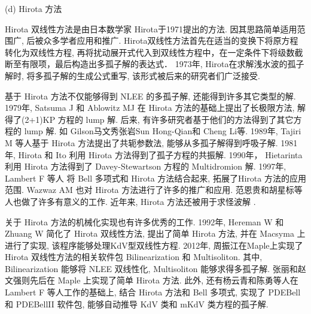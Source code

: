 (d) Hirota 方法

Hirota 双线性方法是由日本数学家 Hirota\cite{hirota1971exact}于1971提出的方法. 因其思路简单\D 适用范围广, 后被众多学者应用和推广. Hirota双线性方法首先在适当的变换下将原方程转化为双线性方程, 再将扰动展开式代入到双线性方程中，在一定条件下将级数截断至有限项，最后构造出多孤子解的表达式． 1973年, Hirota\cite{hirota1973exact}在求解浅水波的孤子解时, 将多孤子解的生成公式重写, 该形式被后来的研究者们广泛接受. 

基于 Hirota 方法不仅能够得到 NLEE 的多孤子解, 还能得到许多其它类型的解. 1979年, Satsuma J 和 Ablowitz MJ \cite{satsuma1979two} 在 Hirota 方法的基础上提出了长极限方法, 解得了(2+1)KP 方程\cite{kadomtsev1970stability}的 lump 解. 后来, 有许多研究者基于他们的方法得到了其它方程的 lump 解. 如 Gilson\cite{gilson1990lump}\D 马文秀\cite{ma2015lump}\D 张岩\cite{zhangYTSF,zhang2018m}\D Sun Hong-Qian\cite{sun2017lump}\D 和 Cheng Li\cite{cheng2017lump}等. 1989年, Tajiri M 等人\cite{tajiri1989breather}基于 Hirota 方法提出了共轭参数法, 能够从多孤子解得到呼吸子解. 1981年, Hirota 和 Ito \cite{hirota1983resonance}利用 Hirota 方法得到了孤子方程的共振解. 1990年， Hietarinta \cite{hietarinta1990multidromion}利用 Hirota 方法得到了 Davey-Stewartson 方程的 Multidromion 解. 1997年, Lambert F 等人\cite{gilson1996combinatorics,lambert1997construction} 将 Bell 多项式和 Hirota 方法结合起来, 拓展了Hirota 方法的应用范围. Wazwaz AM \cite{wazwaz2008multiple} 也对 Hirota 方法进行了许多的推广和应用. 范恩贵\cite{fan2011new}和胡星标\cite{hu1999soliton,hu2002application,hirota2003vector}等人也做了许多有意义的工作. 近年来, Hirota 方法还被用于求怪波解 \cite{guo2011rogue,sun2018general,zhaqilao2018symbolic}.

关于 Hirota 方法的机械化实现也有许多优秀的工作. 1992年, Hereman W 和 Zhuang W \cite{hereman1992symbolic,hereman1991macsyma} 简化了 Hirota 双线性方法, 提出了简单 Hirota 方法, 并在 Macsyma 上进行了实现, 该程序能够处理KdV型双线性方程. 2012年, 周振江\cite{zhou2012}在Maple上实现了 Hirota 双线性方法的相关软件包 Bilinearization 和 Multisoliton. 其中, Bilinearization 能够将 NLEE 双线性化, Multisoliton 能够求得多孤子解. 张丽\cite{zhang2014}和赵文强\cite{zwq2016}则先后在 Maple 上实现了简单 Hirota 方法. 此外, 还有杨云青和陈勇等人\cite{yang2011,miao2014pdebellii}在 Lambert F 等人工作的基础上, 结合 Hirota 方法和 Bell 多项式, 实现了 PDEBell 和 PDEBellII 软件包, 能够自动推导 KdV 类和 mKdV 类方程的孤子解. 

